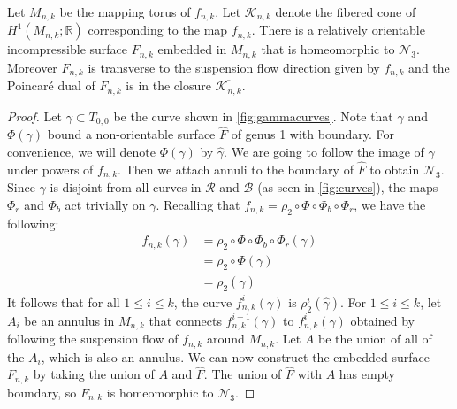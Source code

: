 \begin{prop}
\label{lem:genus3}
Let $M_{n,k}$ be the mapping torus of $f_{n,k}$. Let $\mathcal{K}_{n,k}$ denote the fibered cone of
$H^1(M_{n,k};\mathbb{R})$ corresponding to the map $f_{n,k}$.
There is a relatively orientable incompressible surface $F_{n,k}$ embedded in $M_{n,k}$ that is homeomorphic to $\mathcal{N}_3$.
Moreover $F_{n,k}$ is transverse to the suspension flow direction given by $f_{n,k}$ and the Poincar\'e dual of $F_{n,k}$ is in
the closure $\overline{\mathcal{K}_{n,k}}$.
\end{prop}
\begin{proof}
  Let $\gamma \subset T_{0,0}$ be the curve shown in \autoref{fig:gammacurves}. Note that $\gamma$ and $\Phi(\gamma)$ bound a non-orientable surface
  $\widehat{F}$ of genus 1 with boundary. For convenience, we will denote $\Phi(\gamma)$ by $\widehat{\gamma}$. We are going to follow the image of $\gamma$
  under powers of $f_{n,k}$.  Then we attach annuli to the
  boundary of $\widehat{F}$ to obtain $\mathcal{N}_3$. Since $\gamma$ is disjoint from all curves in $\overline{\mathcal{R}}$ and $\overline{\mathcal{B}}$ (as seen in \autoref{fig:curves}), the maps $\Phi_r$ and $\Phi_b$ act trivially on $\gamma$.  Recalling that $f_{n,k}=\rho_2\circ\Phi\circ\Phi_b\circ\Phi_r$, we have the following:
  \begin{align*}
    f_{n,k}(\gamma) &= \rho_2 \circ \Phi \circ \Phi_b \circ \Phi_r(\gamma) \\
                    &= \rho_2 \circ \Phi(\gamma) \\
                    &= \rho_2(\widehat{\gamma}) %
  \end{align*}
  It follows that for all $1\leq i\leq k$, the curve $f_{n,k}^i(\gamma)$ is $\rho_2^i(\widehat{\gamma})$.
  For $1\leq i\leq k$, let $A_i$ be an annulus in $M_{n,k}$ that connects $f_{n,k}^{i-1}(\gamma)$ to $f_{n,k}^i(\gamma)$ obtained by following the suspension
  flow of $f_{n,k}$ around $M_{n,k}$. Let $A$ be the union of all of the $A_i$, which is also an annulus.  We can now construct the embedded surface $F_{n,k}$ by taking the union of
  $A$ and $\widehat{F}$. The union of $\widehat{F}$ with $A$ has empty boundary, so $F_{n,k}$ is homeomorphic to $\mathcal{N}_3$.


\end{proof}
